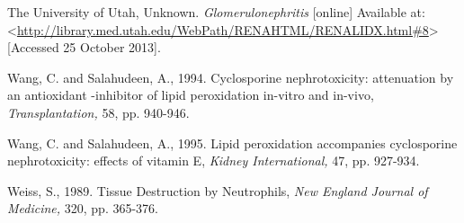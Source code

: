 \documentclass[12pt]{report}
\begin{document}
The University of Utah, Unknown. \textit{Glomerulonephritis} [online] Available at: <\url{http://library.med.utah.edu/WebPath/RENAHTML/RENALIDX.html#8}> [Accessed 25 October 2013].
\newline
\newline

Wang, C. and Salahudeen, A., 1994. Cyclosporine nephrotoxicity: attenuation by an antioxidant -inhibitor of lipid peroxidation in-vitro and in-vivo, \textit{Transplantation,} 58, pp. 940-946.
\newline
\newline

Wang, C. and Salahudeen, A., 1995. Lipid peroxidation accompanies cyclosporine nephrotoxicity: effects of vitamin E, \textit{Kidney International,} 47, pp. 927-934.
\newline
\newline

Weiss, S., 1989. Tissue Destruction by Neutrophils, \textit{New England Journal of Medicine,} 320, pp. 365-376.
\newline
\newline
\end{document}
